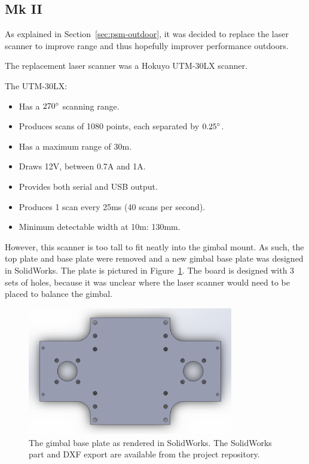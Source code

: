 \documentclass[12pt,oneside,a4paper,draft]{book}
\begin{document}
\subsection{Mk II}
\label{sec:mk-ii}

As explained in Section~\ref{sec:psm-outdoor}, it was decided to
replace the laser scanner to improve range and thus hopefully improver
performance outdoors.

The replacement laser scanner was a Hokuyo UTM-30LX scanner. 

The UTM-30LX:
\begin{itemize}
\item Has a $270\degree$ scanning range.
\item Produces scans of 1080 points, each separated by $0.25\degree$.
\item Has a maximum range of 30m.
\item Draws 12V, between 0.7A and 1A.
\item Provides both serial and USB output.
\item Produces 1 scan every 25ms (40 scans per second).
\item Minimum detectable width at 10m: 130mm.
\end{itemize}

However, this scanner is too tall to fit neatly into the gimbal
mount. As such, the top plate and base plate were removed and a new
gimbal base plate was designed in SolidWorks. The plate is pictured in
Figure~\ref{fig:baseplate}. The board is designed with 3 sets of
holes, because it was unclear where the laser scanner would need to be
placed to balance the gimbal.

\begin{figure}[h]
  \centering
  \includegraphics[width=0.8\textwidth]{figs/baseplate}
  \caption{The gimbal base plate as rendered in SolidWorks. The SolidWorks part and DXF export are available from the project repository.}
  \label{fig:baseplate}
\end{figure}
\end{document}
